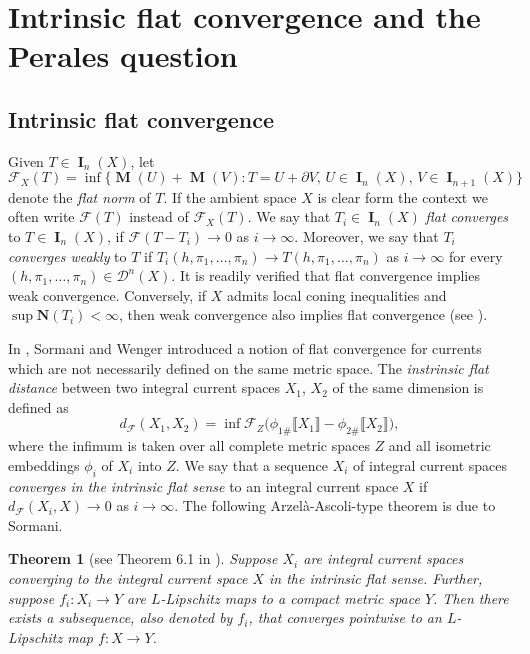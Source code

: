 \documentclass[reqno]{amsart}
\newtheorem{theorem}{Theorem}[section]
\numberwithin{equation}{section}
\newcommand{\bb}[1]{\llbracket #1\rrbracket}
\DeclareMathOperator{\mass}{\mathbf{M}}
\DeclareMathOperator{\bI}{\mathbf{I}}
\begin{document}
\section{Intrinsic flat convergence and the Perales question}
\label{sec:Intrinsic flat convergence}


\subsection{Intrinsic flat convergence}\label{sec:7.1} 
Given \(T\in \bI_n(X)\), let
\[
\mathcal{F}_X(T)=\inf \big\{ \mass(U)+\mass(V) : T=U+\partial V, \, U\in \bI_{n}(X), \, V\in \bI_{n+1}(X)\big\}
\]
denote the \emph{flat norm} of \(T\). If the ambient space \(X\) is clear form the context we often write \(\mathcal{F}(T)\) instead of \(\mathcal{F}_X(T)\). 
We say that \(T_i\in \bI_n(X)\) \emph{flat converges} to \(T\in \bI_n(X)\), if \(\mathcal{F}(T-T_i)\to 0\) as \(i\to \infty\). Moreover, we say that \(T_i\) \emph{converges weakly} to \(T\) if \(T_i(h, \pi_1, \dots, \pi_n) \to T(h, \pi_1, \dots, \pi_n)\) as \(i\to \infty\) for every \((h, \pi_1, \dots, \pi_n)\in \mathcal{D}^n(X)\). It is readily verified that flat convergence implies weak convergence. Conversely, if \(X\) admits local coning inequalities and \(\sup \mathbf{N}(T_i) < \infty\), then weak convergence also implies flat convergence (see \cite{wenger07}).

In \cite{sw11}, Sormani and Wenger introduced a notion of flat convergence for currents which are not necessarily defined on the same metric space. The \emph{instrinsic flat distance} between two integral current spaces \(X_1\), \(X_2\) of the same dimension is defined as 
\[
d_{\mathcal{F}}(X_1, X_2)= \inf \mathcal{F}_Z\big(\phi_{1\#}\bb{X_1}-\phi_{2\#}\bb{X_2}\big),
\]
where the infimum is taken over all complete metric spaces \(Z\) and all isometric embeddings \(\phi_{i}\) of \(X_i\) into \(Z\). We say that a sequence \(X_i\) of integral current spaces \emph{converges in the intrinsic flat sense} to an integral current space \(X\) if \(d_{\mathcal{F}}(X_i, X)\to 0\) as \(i\to \infty\). The following Arzelà-Ascoli-type theorem is due to Sormani.


\begin{theorem}[see Theorem 6.1 in \cite{sor18}]\label{thm:Sormani-arzela}
Suppose \(X_i\) are integral current spaces converging to the integral current space \(X\) in the intrinsic flat sense. Further, suppose \(f_i\colon X_i \to Y\) are \(L\)-Lipschitz maps to a compact metric space \(Y\). Then there exists a subsequence, also denoted by \(f_{i}\), that converges pointwise to an \(L\)-Lipschitz map \(f\colon X \to Y\). 
\end{theorem}
\end{document}

